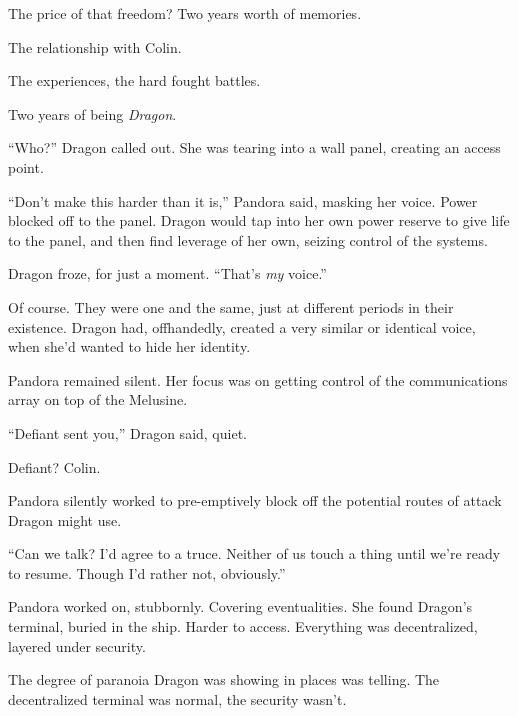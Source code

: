 The price of that freedom?  Two years worth of memories.



The relationship with Colin.



The experiences, the hard fought battles.



Two years of being \emph{Dragon}.



``Who?'' Dragon called out.  She was tearing into a wall panel, creating an access point.



``Don't make this harder than it is,'' Pandora said, masking her voice.  Power blocked off to the panel.  Dragon would tap into her own power reserve to give life to the panel, and then find leverage of her own, seizing control of the systems.



Dragon froze, for just a moment.  ``That's \emph{my} voice.''



Of course.  They were one and the same, just at different periods in their existence.  Dragon had, offhandedly, created a very similar or identical voice, when she'd wanted to hide her identity.



Pandora remained silent.  Her focus was on getting control of the communications array on top of the Melusine.



``Defiant sent you,'' Dragon said, quiet.



Defiant?  Colin.



Pandora silently worked to pre-emptively block off the potential routes of attack Dragon might use.



``Can we talk?  I'd agree to a truce.  Neither of us touch a thing until we're ready to resume.  Though I'd rather not, obviously.''



Pandora worked on, stubbornly.  Covering eventualities.  She found Dragon's terminal, buried in the ship.  Harder to access.  Everything was decentralized, layered under security.



The degree of paranoia Dragon was showing in places was telling.  The decentralized terminal was normal, the security wasn't.



